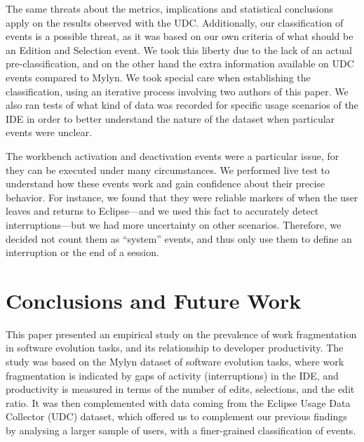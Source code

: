 \documentclass[times]{smrauth}
\begin{document}
The same threats about the metrics, implications and statistical conclusions apply on the results observed with the UDC.  Additionally, our classification of events is a possible threat, as it was based on our own criteria of what should be an Edition and Selection event. We took this liberty due to the lack of an actual pre-classification, and on the other hand the extra information available on UDC events compared to Mylyn. We took special care when establishing the classification, using an iterative process involving two authors of this paper. We also ran tests of what kind of data was recorded for specific usage scenarios of the IDE in order to better understand the nature of the dataset when particular events were unclear.  %

The workbench activation and deactivation events were a particular issue, for they can be executed under many circumstances. We performed live test to understand how these events work and gain confidence about their precise behavior. For instance, we found that they were reliable markers of when the user leaves and returns to Eclipse---and we used this fact to accurately detect interruptions---but we had more uncertainty on other scenarios. Therefore, we decided not count them as ``system'' events, and thus only use them to define an interruption or the end of a session.



\section{Conclusions and Future Work}
This paper presented an empirical study on the prevalence of work fragmentation in software evolution tasks, and its relationship to developer productivity. The study was based on the Mylyn dataset of software evolution tasks, where work fragmentation is indicated by gaps of activity (interruptions) in the IDE, and productivity is measured in terms of the number of edits, selections, and the edit ratio. It was then complemented with data coming from the Eclipse Usage Data Collector (UDC) dataset, which offered us to complement our previous findings by analysing a larger sample of users, with a finer-grained classification of events.
\end{document}
